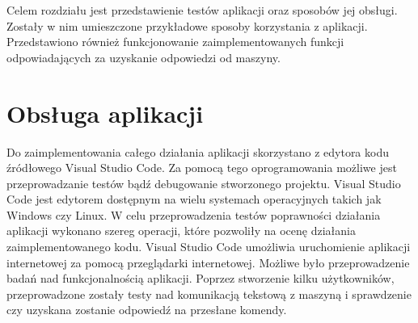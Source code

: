 Celem rozdziału jest przedstawienie testów aplikacji oraz sposobów jej obsługi. Zostały w nim umieszczone przykładowe sposoby korzystania z aplikacji. Przedstawiono również funkcjonowanie zaimplementowanych funkcji odpowiadających za uzyskanie odpowiedzi od maszyny.
\section{Obsługa aplikacji}
Do zaimplementowania całego działania aplikacji skorzystano z edytora kodu źródłowego Visual Studio Code. Za pomocą tego oprogramowania możliwe jest przeprowadzanie testów bądź debugowanie stworzonego projektu. Visual Studio Code jest edytorem dostępnym na wielu systemach operacyjnych takich jak Windows czy Linux. W celu przeprowadzenia testów poprawności działania aplikacji wykonano szereg operacji, które pozwoliły na ocenę działania zaimplementowanego kodu. Visual Studio Code umożliwia uruchomienie aplikacji internetowej za pomocą przeglądarki internetowej. Możliwe było przeprowadzenie badań nad funkcjonalnością aplikacji. Poprzez stworzenie kilku użytkowników, przeprowadzone zostały testy nad komunikacją tekstową z maszyną i sprawdzenie czy uzyskana zostanie odpowiedź na przesłane komendy.
